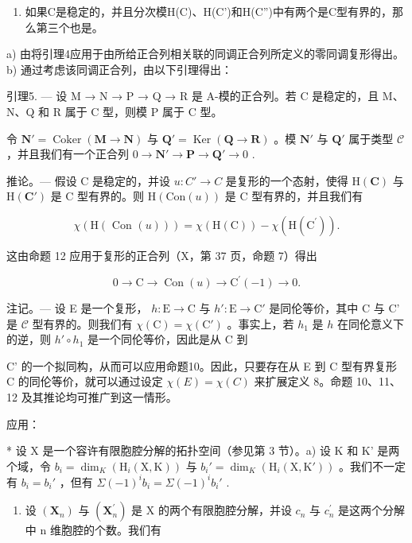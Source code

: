 \begin{enumerate}
\def\labelenumi{\alph{enumi})}
\setcounter{enumi}{1}
\tightlist
\item
  如果C是稳定的，并且分次模H(C)、H(C')和H(C'')中有两个是C型有界的，那么第三个也是。
\end{enumerate}

a) 由将引理4应用于由所给正合列相关联的同调正合列所定义的零同调复形得出。b) 通过考虑该同调正合列，由以下引理得出：

引理5. --- 设 M → N → P → Q → R 是 A-模的正合列。若 C 是稳定的，且 M、N、Q 和 R 属于 C 型，则模 P 属于 C 型。

令 \(\mathbf{N}' = \operatorname{Coker} (\mathbf{M} \to \mathbf{N})\) 与 \(\mathbf{Q}' = \operatorname{Ker} (\mathbf{Q} \to \mathbf{R})\) 。模 \(\mathbf{N}'\) 与 \(\mathbf{Q}'\) 属于类型 \(\mathcal{C}\) ，并且我们有一个正合列 \(0 \to \mathbf{N}' \to \mathbf{P} \to \mathbf{Q}' \to 0\) .

推论。--- 假设 C 是稳定的，并设 \(u : C' \to C\) 是复形的一个态射，使得 \(\mathrm{H}(\mathbf{C})\) 与 \(\mathrm{H}(\mathbf{C}')\) 是 C 型有界的。则 \(\mathrm{H}(\mathrm{Con}(u))\) 是 C 型有界的，并且我们有

\[
\chi (\mathrm{H} (\text { Con } (u))) = \chi (\mathrm{H} (\mathrm{C})) - \chi (\mathrm{H} (\mathrm{C} ^ {\prime})) .
\]

这由命题 12 应用于复形的正合列（X，第 37 页，命题 7）得出

\[
0 \rightarrow \mathrm{C} \rightarrow \operatorname{Con} (u) \rightarrow \mathrm{C} ^ {\prime} (- 1) \rightarrow 0.
\]

注记。--- 设 E 是一个复形， \(h: \mathrm{E} \to \mathrm{C}\) 与 \(h': \mathrm{E} \to \mathrm{C}'\) 是同伦等价，其中 C 与 C' 是 \(\mathcal{C}\) 型有界的。则我们有 \(\chi(\mathrm{C}) = \chi(\mathrm{C}')\) 。事实上，若 \(h_1\) 是 \(h\) 在同伦意义下的逆，则 \(h' \circ h_1\) 是一个同伦等价，因此是从 C 到

C' 的一个拟同构，从而可以应用命题10。因此，只要存在从 E 到 C 型有界复形 C 的同伦等价，就可以通过设定 \(\chi(E) = \chi(C)\) 来扩展定义 8。命题 10、11、12 及其推论均可推广到这一情形。

应用：

* 设 X 是一个容许有限胞腔分解的拓扑空间（参见第 3 节）。a) 设 K 和 K' 是两个域，令 \(b_i = \dim_K(\mathrm{H}_i(\mathrm{X}, \mathrm{K}))\) 与 \(b_i' = \dim_K(\mathrm{H}_i(\mathrm{X}, \mathrm{K}'))\) 。我们不一定有 \(b_i = b_i'\) ，但有 \(\Sigma(-1)^i b_i = \Sigma(-1)^i b_i'\) .

\begin{enumerate}
\def\labelenumi{\alph{enumi})}
\setcounter{enumi}{1}
\tightlist
\item
  设 \((\mathbf{X}_{n})\) 与 \((\mathbf{X}_{n}^{\prime})\) 是 X 的两个有限胞腔分解，并设 \(c_{n}\) 与 \(c_{n}^{\prime}\) 是这两个分解中 n 维胞腔的个数。我们有
\end{enumerate}

